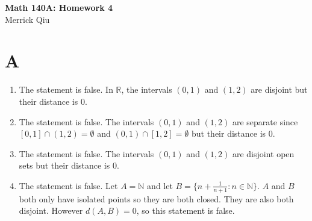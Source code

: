 \documentclass{article}
\begin{document}
\begin{center}
	\huge{\bf Math 140A: Homework 4} \\
	Merrick Qiu
\end{center}
\section*{A}
\begin{enumerate}
    \item The statement is false. 
    In $\mathbb{R}$, the intervals $(0,1)$ and $(1,2)$ are disjoint but 
    their distance is $0$.
    \item The statement is false.
    The intervals $(0,1)$ and $(1,2)$ are separate since 
    $[0,1] \cap (1,2) = \emptyset$ and $(0,1) \cap [1,2] = \emptyset$ but 
    their distance is $0$.
    \item The statement is false.
    The intervals $(0,1)$ and $(1,2)$ are disjoint open sets but 
    their distance is $0$.
    \item The statement is false.
    Let $A = \mathbb{N}$ and let $B = \{n + \frac{1}{n+1} : n \in \mathbb{N}\}$.
    $A$ and $B$ both only have isolated points so they are both closed.
    They are also both disjoint.
    However $d(A,B) = 0$, so this statement is false.
\end{enumerate}
\newpage 
\end{document}

